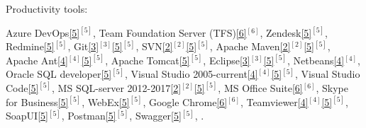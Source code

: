 \begin{cventries}
  \cventry
    {Productivity tools:} %
    {} %
    {} %
    {} %
    {
      \begin{cvitems} %
        \item {        
        Azure DevOps\ref{5}{$^{[5]}$},         
        Team Foundation Server (TFS)\ref{6}{$^{[6]}$},
        Zendesk\ref{5}{$^{[5]}$},
        Redmine\ref{5}{$^{[5]}$},  
        Git\ref{3}{$^{[3]}$}\ref{5}{$^{[5]}$}, 
        SVN\ref{2}{$^{[2]}$}\ref{5}{$^{[5]}$},
        Apache Maven\ref{2}{$^{[2]}$}\ref{5}{$^{[5]}$},
        Apache Ant\ref{4}{$^{[4]}$}\ref{5}{$^{[5]}$},  
        Apache Tomcat\ref{5}{$^{[5]}$},  
        Eclipse\ref{3}{$^{[3]}$}\ref{5}{$^{[5]}$},  
        Netbeans\ref{4}{$^{[4]}$}, 
        Oracle SQL developer\ref{5}{$^{[5]}$},
        Visual Studio 2005-current\ref{4}{$^{[4]}$}\ref{5}{$^{[5]}$},
        Visual Studio Code\ref{5}{$^{[5]}$},
        MS SQL-server 2012-2017\ref{2}{$^{[2]}$}\ref{5}{$^{[5]}$},
        MS Office Suite\ref{6}{$^{[6]}$},
        Skype for Business\ref{5}{$^{[5]}$},
        WebEx\ref{5}{$^{[5]}$},
        Google Chrome\ref{6}{$^{[6]}$},        
        Teamviewer\ref{4}{$^{[4]}$}\ref{5}{$^{[5]}$},
        SoapUI\ref{5}{$^{[5]}$},
        Postman\ref{5}{$^{[5]}$},
        Swagger\ref{5}{$^{[5]}$},        
        .}       
      \end{cvitems}
    }  
  \vspace{-0.4cm}  
    

\end{cventries}
